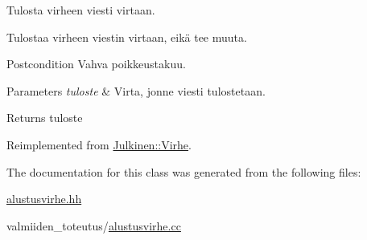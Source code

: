 Tulosta virheen viesti virtaan. 

Tulostaa virheen viestin virtaan, eikä tee muuta.

\begin{DoxyPostcond}{Postcondition}
Vahva poikkeustakuu. 
\end{DoxyPostcond}

\begin{DoxyParams}{Parameters}
{\em tuloste} & Virta, jonne viesti tulostetaan. \\
\hline
\end{DoxyParams}
\begin{DoxyReturn}{Returns}
{\ttfamily tuloste} 
\end{DoxyReturn}


Reimplemented from \hyperlink{class_julkinen_1_1_virhe_a36a2644943038f9760b5d76a1960b00d}{Julkinen\+::\+Virhe}.



The documentation for this class was generated from the following files\+:\begin{DoxyCompactItemize}
\item 
\hyperlink{alustusvirhe_8hh}{alustusvirhe.\+hh}\item 
valmiiden\+\_\+toteutus/\hyperlink{alustusvirhe_8cc}{alustusvirhe.\+cc}\end{DoxyCompactItemize}
